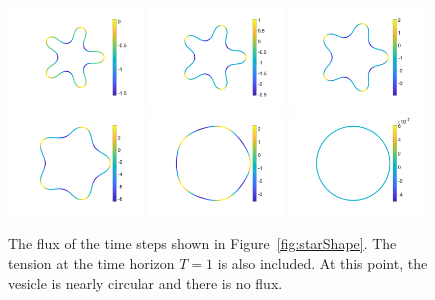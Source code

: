 \documentclass[aps,prl,showpacs]{revtex4}
\newif\ifTikz
\begin{document}
\begin{figure}[htp]
\begin{minipage}{0.40\textwidth}
\ifTikz

\fi
\end{minipage}
\hfill
\begin{minipage}{0.55\textwidth}
\includegraphics[width=0.32\textwidth]{figures/StarFluxTime1.pdf}
\includegraphics[width=0.32\textwidth]{figures/StarFluxTime2.pdf}
\includegraphics[width=0.32\textwidth]{figures/StarFluxTime3.pdf} \\
\includegraphics[width=0.32\textwidth]{figures/StarFluxTime4.pdf}
\includegraphics[width=0.32\textwidth]{figures/StarFluxTime5.pdf}
\includegraphics[width=0.32\textwidth]{figures/StarFluxTime6.pdf}
\end{minipage}
  \caption{\label{fig:starFlux} The flux of the time steps shown in
  Figure~\ref{fig:starShape}. The tension at the time horizon $T=1$ is
  also included. At this point, the vesicle is nearly circular and there
  is no flux.}
\end{figure}
\end{document}
